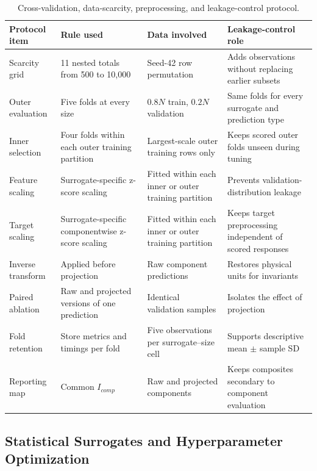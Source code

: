 \documentclass[a4paper,fleqn]{cas-sc}
\newcommand{\csvcomma}{,}
\begin{document}
\begin{table}[htbp]
\centering
\caption{Cross-validation, data-scarcity, preprocessing, and leakage-control protocol.}
\label{tab:data_protocol}
\scriptsize
\setlength{\tabcolsep}{3pt}
\begin{tabular}{p{2.6cm}p{3.1cm}p{3.0cm}p{3.1cm}}
\hline
Protocol item & Rule used & Data involved & Leakage-control role \\
\hline
Scarcity grid & 11 nested totals from 500 to 10\csvcomma{}000 & Seed-42 row permutation & Adds observations without replacing earlier subsets \\
Outer evaluation & Five folds at every size & $0.8N$ train\csvcomma{} $0.2N$ validation & Same folds for every surrogate and prediction type \\
Inner selection & Four folds within each outer training partition & Largest-scale outer training rows only & Keeps scored outer folds unseen during tuning \\
Feature scaling & Surrogate-specific z-score scaling & Fitted within each inner or outer training partition & Prevents validation-distribution leakage \\
Target scaling & Surrogate-specific componentwise z-score scaling & Fitted within each inner or outer training partition & Keeps target preprocessing independent of scored responses \\
Inverse transform & Applied before projection & Raw component predictions & Restores physical units for invariants \\
Paired ablation & Raw and projected versions of one prediction & Identical validation samples & Isolates the effect of projection \\
Fold retention & Store metrics and timings per fold & Five observations per surrogate--size cell & Supports descriptive mean $\pm$ sample SD \\
Reporting map & Common $I_{comp}$ & Raw and projected components & Keeps composites secondary to component evaluation \\
\hline
\end{tabular}
\end{table}

\subsection{Statistical Surrogates and Hyperparameter Optimization}
\end{document}
